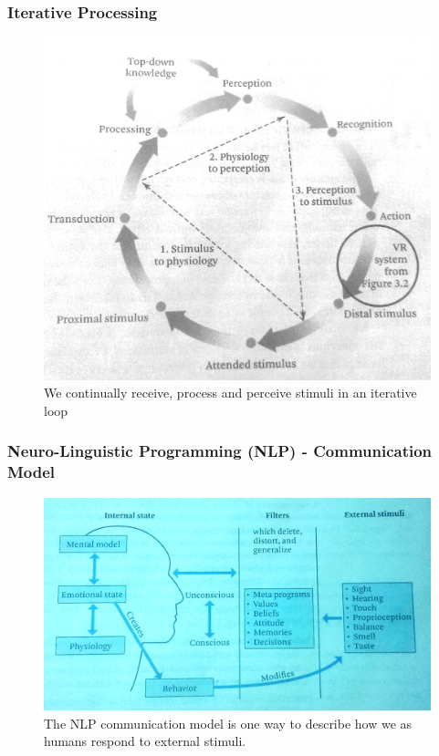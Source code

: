 \begin{frame}
	\frametitle{Iterative Processing}
	\begin{figure}
		 \includegraphics[scale=.1]{assets/iterative}
		 \caption{ We continually receive, process and perceive stimuli in an iterative loop}
		 
	\end{figure}
\end{frame}


\begin{frame}
	\frametitle{\tiny{Neuro-Linguistic Programming (NLP) - Communication Model}}
	\begin{figure}
		 \includegraphics[scale=.2]{assets/nlp}
		 \caption{The NLP communication model is one way to describe how we as humans respond to external stimuli.  }
		 
	\end{figure}
\end{frame}

